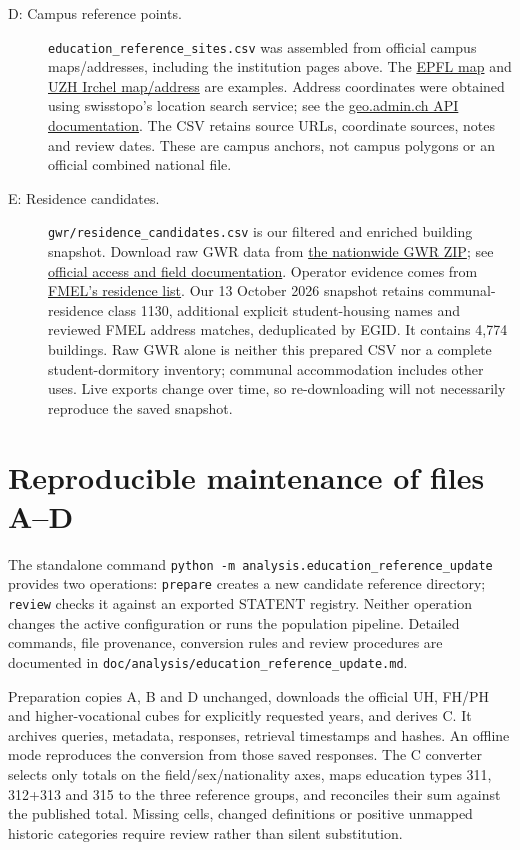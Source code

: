 \documentclass[11pt,a4paper]{article}
\newcommand{\code}[1]{\nolinkurl{#1}}
\begin{document}
\begin{description}
\item[D: Campus reference points.] \code{education_reference_sites.csv} was
assembled from official campus maps/addresses, including the institution
pages above. The \href{https://plan.epfl.ch/}{EPFL map} and
\href{https://students.uzh.ch/de/dates/sites/irchel.html}{UZH Irchel map/address}
are examples. Address coordinates were obtained using swisstopo's location
search service; see the \href{https://docs.geo.admin.ch/}{geo.admin.ch API documentation}.
The CSV retains source URLs, coordinate sources, notes and review dates. These
are campus anchors, not campus polygons or an official combined national file.

\item[E: Residence candidates.] \code{gwr/residence_candidates.csv} is our
filtered and enriched building snapshot. Download raw GWR data from
\href{https://public.madd.bfs.admin.ch/ch.zip}{the nationwide GWR ZIP}; see
\href{https://www.gwr.admin.ch/de/data/supply/public_content.html}{official access and field documentation}.
Operator evidence comes from \href{https://www.fmel.ch/nos-maisons}{FMEL's residence list}.
Our 13 October 2026 snapshot retains communal-residence class 1130, additional
explicit student-housing names and reviewed FMEL address matches, deduplicated
by EGID. It contains 4,774 buildings. Raw GWR alone is neither this prepared
CSV nor a complete student-dormitory inventory; communal accommodation includes
other uses. Live exports change over time, so re-downloading will not necessarily
reproduce the saved snapshot.
\end{description}

\section{Reproducible maintenance of files A--D}

The standalone command \code{python -m analysis.education_reference_update}
provides two operations: \code{prepare} creates a new candidate reference
directory; \code{review} checks it against an exported STATENT registry. Neither
operation changes the active configuration or runs the population pipeline.
Detailed commands, file provenance, conversion rules and review procedures are
documented in \code{doc/analysis/education_reference_update.md}.

Preparation copies A, B and D unchanged, downloads the official UH, FH/PH and
higher-vocational cubes for explicitly requested years, and derives C. It
archives queries, metadata, responses, retrieval timestamps and hashes. An
offline mode reproduces the conversion from those saved responses. The C
converter selects only totals on the field/sex/nationality axes, maps education
types 311, 312+313 and 315 to the three reference groups, and reconciles their
sum against the published total. Missing cells, changed definitions or positive
unmapped historic categories require review rather than silent substitution.
\end{document}
